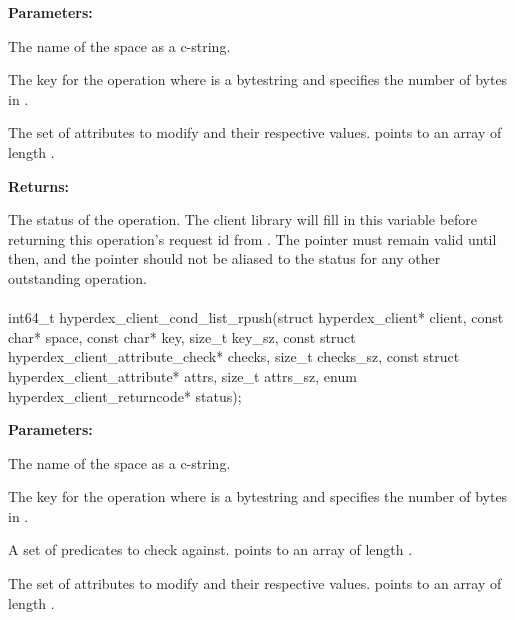 \noindent\textbf{Parameters:}
\begin{description}[labelindent=\widthof{{\code{attrs}, \code{attrs\_sz}}},leftmargin=*,noitemsep,nolistsep,align=right]
\item[\code{space}] The name of the space as a c-string.
\item[\code{key}, \code{key\_sz}] The key for the operation where  is a bytestring and  specifies the number of bytes in .
\item[\code{attrs}, \code{attrs\_sz}] The set of attributes to modify and their respective values.   points to an array of length .
\end{description}

\noindent\textbf{Returns:}
\begin{description}[labelindent=\widthof{{\code{status}}},leftmargin=*,noitemsep,nolistsep,align=right]
\item[\code{status}] The status of the operation.  The client library will fill in this variable before returning this operation's request id from .  The pointer must remain valid until then, and the pointer should not be aliased to the status for any other outstanding operation.
\end{description}

\paragraph{}
\label{api:c:cond_list_rpush}
\begin{ccode}
int64_t hyperdex_client_cond_list_rpush(struct hyperdex_client* client,
                const char* space,
                const char* key, size_t key_sz,
                const struct hyperdex_client_attribute_check* checks, size_t checks_sz,
                const struct hyperdex_client_attribute* attrs, size_t attrs_sz,
                enum hyperdex_client_returncode* status);
\end{ccode}
\funcdesc 

\noindent\textbf{Parameters:}
\begin{description}[labelindent=\widthof{{\code{checks}, \code{checks\_sz}}},leftmargin=*,noitemsep,nolistsep,align=right]
\item[\code{space}] The name of the space as a c-string.
\item[\code{key}, \code{key\_sz}] The key for the operation where  is a bytestring and  specifies the number of bytes in .
\item[\code{checks}, \code{checks\_sz}] A set of predicates to check against.   points to an array of length .
\item[\code{attrs}, \code{attrs\_sz}] The set of attributes to modify and their respective values.   points to an array of length .
\end{description}

